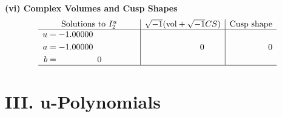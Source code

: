 \documentclass[1p]{elsarticle_modified}
\theoremstyle{definition}
\newcommand{\I}{\sqrt{-1}}
\begin{document}
\newpage\flushleft \textbf{(vi) Complex Volumes and Cusp Shapes}
$$\begin{array}{c|c|c}  
\text{Solutions to }I^u_{2}& \I (\text{vol} + \sqrt{-1}CS) & \text{Cusp shape}\\
 \hline 
\begin{aligned}
u &= -1.00000\phantom{ +0.000000I} \\
a &= -1.00000\phantom{ +0.000000I} \\
b &= \phantom{-0.000000 } 0\end{aligned}
 & \phantom{-0.000000 } 0 & \phantom{-0.000000 } 0\\
 \hline 
 \end{array}$$\newpage
\newpage\renewcommand{\arraystretch}{1}
\centering \section*{ III. u-Polynomials}
\end{document}
